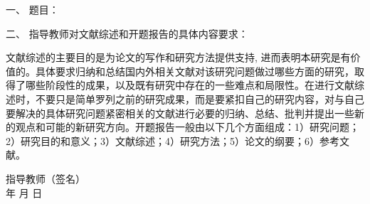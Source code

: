 \newpage

\thispagestyle{empty}

{
\setlength{\parindent}{0em}
\renewcommand{\baselinestretch}{2}
{\songti\sihao\bfseries

一、 \; 题目： \; \underline{\makebox[24em]{\zjutitlec}}

\vspace{2em}

二、 \; 指导教师对文献综述和开题报告的具体内容要求： \\ \par
}
{
  \songti\xiaosi 


文献综述的主要目的是为论文的写作和研究方法提供支持, 进而表明本研究是有价值的。具体要求归纳和总结国内外相关文献对该研究问题做过哪些方面的研究，取得了哪些阶段性的成果，以及既有研究中存在的一些难点和局限性。在进行文献综述时，不要只是简单罗列之前的研究成果，而是要紧扣自己的研究内容，对与自己要解决的具体研究问题紧密相关的文献进行必要的归纳、总结、批判并提出一些新的观点和可能的新研究方向。开题报告一般由以下几个方面组成：1）研究问题；2）研究目的和意义；3）文献综述；4）研究方法；5）论文的纲要；6）参考文献。
}

\vspace{9cm}

}
{
\songti\xiaosi\bfseries
\begin{flushright}
  指导教师（签名） \; \underline{\hspace{6em}} \\
  年 \qquad 月 \qquad 日
\end{flushright}
}


